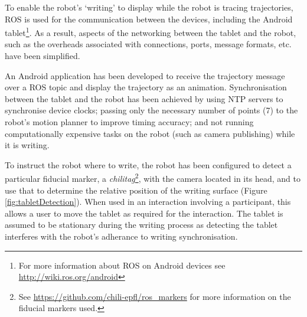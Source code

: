 \documentclass{sig-alternate}
\begin{document}

To enable the robot's `writing' to display while the robot is tracing
trajectories, ROS is used for the communication between the devices,
including the Android tablet\footnote{For more information about ROS on Android
devices see \url{http://wiki.ros.org/android}}. As a result, aspects of the
networking between the tablet and the robot, such as the overheads associated
with connections, ports, message formats, etc. have been simplified. 

An Android application has been developed to receive the trajectory message over
a ROS topic and display the trajectory as an
animation. Synchronisation between the tablet and the robot has been achieved by
using NTP servers to synchronise device clocks; passing only the necessary number of points (7)
to the robot's motion planner to improve timing accuracy; and not running 
computationally expensive tasks on the robot (such as camera publishing) while it 
is writing.







To instruct the robot where to write, the robot has been configured to detect a
particular fiducial marker, a \emph{chilitag}\footnote{See
\url{https://github.com/chili-epfl/ros_markers} for more information on the
fiducial markers used.}, with the camera located in its head, and to use that to
determine the relative position of the writing surface (Figure
\ref{fig:tabletDetection}). When used in an interaction involving a participant, this
allows a user to move the tablet as required for the interaction. The tablet is 
assumed to be stationary during the writing process as detecting the tablet interferes
with the robot's adherance to writing synchronisation.
\end{document}
